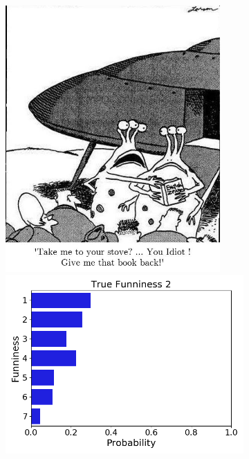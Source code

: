 \documentclass[draft,final,oneside]{vutinfth} %
\begin{document}
\begin{figure}
\begin{subfigure}[b]{0.45\textwidth}
\end{subfigure}\quad
\begin{subfigure}[b]{0.45\textwidth}
\centering
\includegraphics[width=0.9\textwidth,height=0.3\textheight,keepaspectratio]{graphics/detail/Test_for_Image_2_cartoon} \\
\includegraphics[width=1.0\textwidth]{graphics/detail/Test_for_Image_2}
\end{subfigure}


\end{figure}
\end{document}
